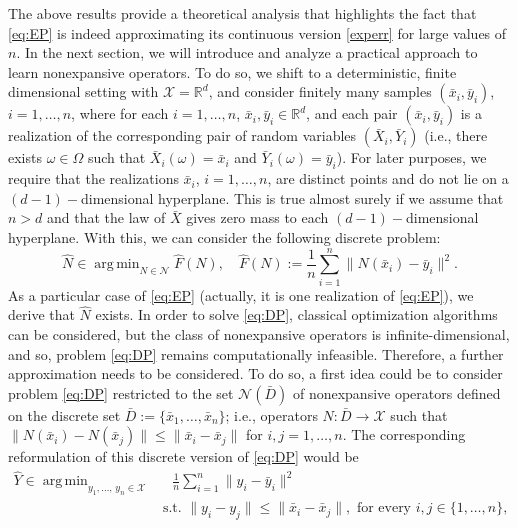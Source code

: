 \documentclass[onefignum,onetabnum]{siamonline250211}
\newcommand{\N}{\mathcal{N}}
\newcommand{\R}{\mathbb{R}}
\newcommand{\bx}{\bar{x}}
\newcommand{\by}{\bar{y}}
\newcommand{\bX}{\bar{X}}
\newcommand{\bY}{\bar{Y}}
\newcommand{\cX}{\mathcal{X}}
\DeclareMathOperator*{\argmin}{arg\,min}
\begin{document}
The above results provide a theoretical analysis that highlights the fact that \cref{eq:EP} is indeed approximating its continuous version \cref{experr} for large values of $n$. In the next section, we will introduce and analyze a practical approach to learn nonexpansive operators. To do so, we shift to a deterministic, finite dimensional setting with $\cX=\R^d$, and consider finitely many samples $(\bar x_i, \bar y_i)$, $i=1,\ldots,n$, where for each $i=1,\ldots, n$,  $\bx_i, \by_i\in\R^d$, and each pair $(\bx_i, \by_i)$ is a realization of the corresponding pair of random variables $(\bX_i, \bY_i)$ (i.e., there exists $\omega\in\Omega$ such that $\bX_i(\omega)=\bx_i$ and $\bY_i(\omega)=\by_i$). For later purposes, we require that the realizations $\bx_i$, $i=1,\dots, n$, are distinct points and do not lie on a $(d-1)-$dimensional hyperplane. This is true almost surely if we assume that $n > d$ and that the law of $\bar X$ gives zero mass to each $(d-1)-$dimensional hyperplane. With this, we can consider the following discrete problem:
\begin{equation}\label{eq:DP}
\tag{DP}
\widehat{N}\in \argmin_{N\in\N}\widehat{F}(N), \quad \widehat{F}(N):=\frac{1}{n}\sum_{i=1}^n \|N(\bar{x}_i)-\bar{y}_i\|^2.
\end{equation}
As a particular case of \cref{eq:EP} (actually, it is one realization of \cref{eq:EP}), we derive that $\widehat{N}$ exists. In order to solve \cref{eq:DP}, classical optimization algorithms can be considered, but the class of nonexpansive operators is infinite-dimensional, and so, problem \cref{eq:DP} remains computationally infeasible. Therefore, a further approximation needs to be considered. To do so, a first idea could be to consider problem \cref{eq:DP} restricted to the set $\mathcal{N}(\bar{D})$ of nonexpansive operators defined on the discrete set $\bar{D}:=\{\bar{x}_1,\ldots, \bx_n\}$; i.e., operators $N:\bar{D}\to \cX$ such that $\|N(\bar{x}_i)-N(\bar{x}_j)\|\leq \|\bar{x}_i-\bar{x}_j\|$ for $i,j=1,\dots,n$. The corresponding reformulation of this discrete version of \cref{eq:DP} would be
\begin{equation}\label{eq:sololip}
\begin{aligned}
    \widehat Y\in\argmin_{y_1,\ldots, \, y_n\in\cX} & \quad \frac{1}{n}\sum_{i=1}^n\|y_i-\bar{y}_i\|^2\\ 
    & \text{ s.t. } \|y_i-y_j\|\leq \|\bx_i-\bx_j\|, \text{ for every } i,j\in\{1,\dots,n\},
\end{aligned}
\end{equation}
\end{document}
